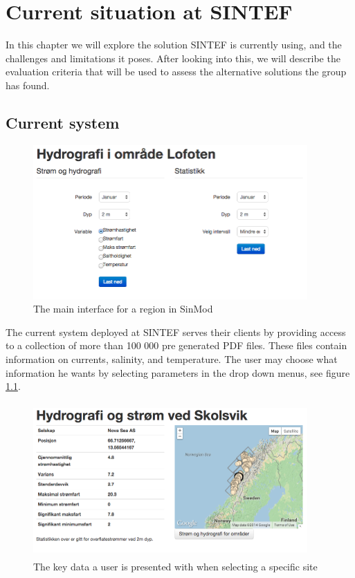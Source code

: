 \documentclass[11pt,a4paper,titlepage,oneside]{report}
\begin{document}
\chapter{Current situation at SINTEF}
In this chapter we will explore the solution SINTEF is currently using, and the challenges and limitations it poses. After looking into this, we will describe the evaluation criteria that will be used to assess the alternative solutions the group has found. 
\section{Current system}
\begin{figure}[h]
\begin{center}
\includegraphics[height=223px,width=396px]{img/region_interface_sinmod.png}
\caption{The main interface for a region in SinMod}
\label{fig:sinmod-region-main-interface}
\end{center}
\end{figure}

The current system deployed at SINTEF serves their clients by providing access to a collection of more than 100 000 pre generated PDF files. These files contain information on currents, salinity, and temperature. The user may choose what information he wants by selecting parameters in the drop down menus, see figure \ref{fig:sinmod-region-main-interface}.

\begin{figure}[h]
\begin{center}
\includegraphics[height=223px,width=396px]{img/site_key_data.png}
\caption{The key data a user is presented with when selecting a specific site}
\label{fig:sinmod-site-key-data}
\end{center}
\end{figure}
\end{document}
